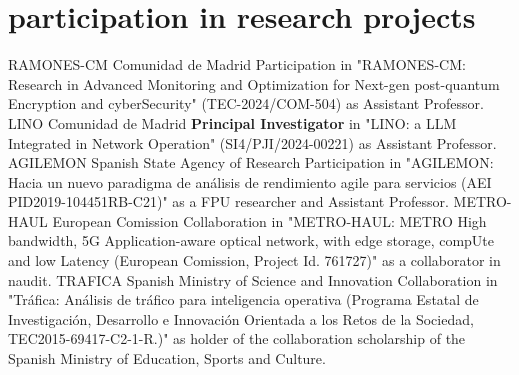 \documentclass[]{friggeri-cv}
\begin{document}
\section{participation in research projects}
\vspace{-1em}
\begin{entrylist}
{RAMONES-CM}
{Comunidad de Madrid}
{Participation in "RAMONES-CM: Research in Advanced Monitoring and Optimization for Next-gen post-quantum Encryption and cyberSecurity" (TEC-2024/COM-504) as Assistant Professor.
}
{LINO}
{Comunidad de Madrid}
{\textbf{Principal Investigator} in "LINO: a LLM Integrated in Network Operation" (SI4/PJI/2024-00221) as Assistant Professor.
}
{AGILEMON}
{Spanish State Agency of Research}
{Participation in "AGILEMON: Hacia un nuevo paradigma de análisis de rendimiento agile para servicios (AEI PID2019-104451RB-C21)" as a FPU researcher and Assistant Professor.
}
{METRO-HAUL}
{European Comission}
{Collaboration in "METRO-HAUL: METRO High bandwidth, 5G Application-aware optical network, with edge storage, compUte and low Latency (European Comission, Project Id. 761727)" as a collaborator in naudit.
}
{TRAFICA}
{Spanish Ministry of Science and Innovation}
{Collaboration in  "Tráfica: Análisis de tráfico para inteligencia operativa (Programa Estatal de Investigación, Desarrollo e Innovación Orientada a los Retos de la Sociedad, TEC2015-69417-C2-1-R.)" as holder of the collaboration scholarship of the Spanish Ministry of Education, Sports and Culture.
}
\end{entrylist}
\vspace{-2em}
\end{document}
